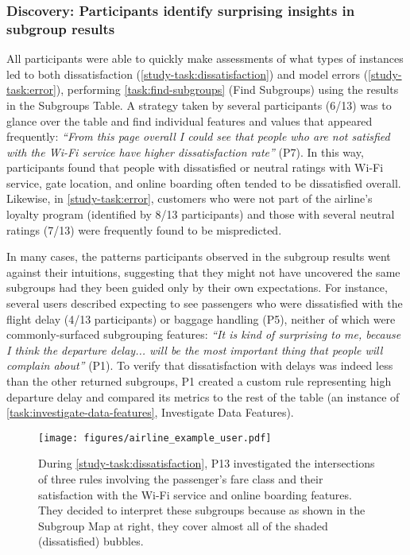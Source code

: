 \subsubsection{Discovery: Participants identify surprising insights in subgroup results}
\label{sec:results-discovery}
All participants were able to quickly make assessments of what types of instances led to both dissatisfaction (\ref{study-task:dissatisfaction}) and model errors (\ref{study-task:error}), performing \ref{task:find-subgroups} (Find Subgroups) using the results in the Subgroups Table.
A strategy taken by several participants (6/13) was to glance over the table and find individual features and values that appeared frequently: \textit{``From this page overall I could see that people who are not satisfied with the Wi-Fi service have higher dissatisfaction rate''} (P7).
In this way, participants found that people with dissatisfied or neutral ratings with Wi-Fi service, gate location, and online boarding often tended to be dissatisfied overall.
Likewise, in \ref{study-task:error}, customers who were not part of the airline's loyalty program (identified by 8/13 participants) and those with several neutral ratings (7/13) were frequently found to be mispredicted.

In many cases, the patterns participants observed in the subgroup results went against their intuitions, suggesting that they might not have uncovered the same subgroups had they been guided only by their own expectations.
For instance, several users described expecting to see passengers who were dissatisfied with the flight delay (4/13 participants) or baggage handling (P5), neither of which were commonly-surfaced subgrouping features: \textit{``It is kind of surprising to me, because I think the departure delay... will be the most important thing that people will complain about''} (P1).
To verify that dissatisfaction with delays was indeed less than the other returned subgroups, P1 created a custom rule representing high departure delay and compared its metrics to the rest of the table (an instance of \ref{task:investigate-data-features}, Investigate Data Features).

\begin{figure*}
    \centering
    \texttt{[image: figures/airline\_example\_user.pdf]}
    \caption{During \ref{study-task:dissatisfaction}, P13 investigated the intersections of three rules involving the passenger's fare class and their satisfaction with the Wi-Fi service and online boarding features. They decided to interpret these subgroups because as shown in the Subgroup Map at right, they cover almost all of the shaded (dissatisfied) bubbles.}
    \label{fig:airline-example}
\end{figure*}

